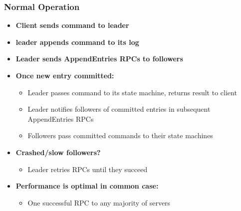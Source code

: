 \begin{frame}
    \frametitle{Normal Operation}
    \begin{itemize}
        \item \textbf{Client sends command to leader}
        \item \textbf{leader appends command to its log}
        \item \textbf{Leader sends AppendEntries RPCs to followers}
        \item \textbf{Once new entry committed:}
            \begin{itemize}
                \item Leader passes command to its state machine, returns result to client
                \item Leader notifies followers of committed entries in subsequent AppendEntries RPCs
                \item Followers pass committed commands to their state machines
            \end{itemize}
        \item \textbf{Crashed/slow followers?}
            \begin{itemize}
                \item Leader retries RPCs until they succeed
            \end{itemize}
        \item \textbf{Performance is optimal in common case:}
            \begin{itemize}
                \item One successful RPC to any majority of servers
            \end{itemize}
    \end{itemize}
\end{frame}

